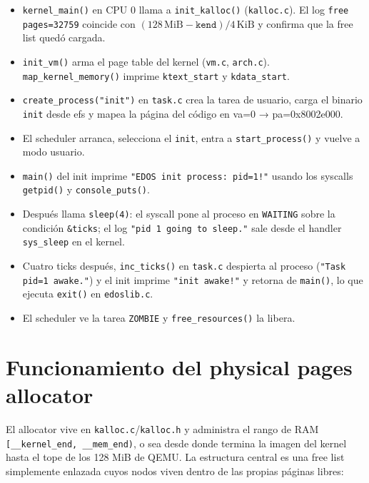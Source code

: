 \documentclass[11pt,a4paper]{article}
\begin{document}
\begin{itemize}[leftmargin=1.4em]
    \item \texttt{kernel\_main()} en CPU 0 llama a \texttt{init\_kalloc()}
    (\texttt{kalloc.c}). El log \texttt{free pages=32759} coincide con
    $(128\,\text{MiB} - \texttt{kend}) / 4\,\text{KiB}$ y confirma que la free
    list quedó cargada.
    \item \texttt{init\_vm()} arma el page table del kernel (\texttt{vm.c},
    \texttt{arch.c}). \texttt{map\_kernel\_memory()} imprime
    \texttt{ktext\_start} y \texttt{kdata\_start}.
    \item \texttt{create\_process("init")} en \texttt{task.c} crea la tarea de
    usuario, carga el binario \texttt{init} desde efs y mapea la página del
    código en va=0 → pa=0x8002e000.
    \item El scheduler arranca, selecciona el \texttt{init}, entra a
    \texttt{start\_process()} y vuelve a modo usuario.
    \item \texttt{main()} del init imprime \texttt{"EDOS init process: pid=1!"}
    usando los syscalls \texttt{getpid()} y \texttt{console\_puts()}.
    \item Después llama \texttt{sleep(4)}: el syscall pone al proceso en
    \texttt{WAITING} sobre la condición \texttt{\&ticks}; el log
    \texttt{"pid 1 going to sleep."} sale desde el handler \texttt{sys\_sleep}
    en el kernel.
    \item Cuatro ticks después, \texttt{inc\_ticks()} en \texttt{task.c}
    despierta al proceso (\texttt{"Task pid=1 awake."}) y el init imprime
    \texttt{"init awake!"} y retorna de \texttt{main()}, lo que ejecuta
    \texttt{exit()} en \texttt{edoslib.c}.
    \item El scheduler ve la tarea \texttt{ZOMBIE} y \texttt{free\_resources()}
    la libera.
\end{itemize}

\section{Funcionamiento del physical pages allocator}

El allocator vive en \texttt{kalloc.c}/\texttt{kalloc.h} y administra el rango de
RAM \texttt{[\_\_kernel\_end, \_\_mem\_end)}, o sea desde donde termina la imagen
del kernel hasta el tope de los 128 MiB de QEMU. La estructura central es una
free list simplemente enlazada cuyos nodos viven dentro de las propias páginas
libres:
\end{document}
